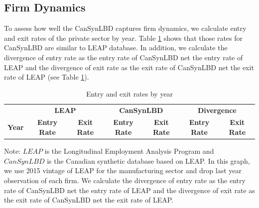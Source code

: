 \documentclass{article}
\begin{document}
\subsection{Firm Dynamics}
To assess how well the CanSynLBD captures firm dynamics, we calculate entry and exit rates of the private sector by year. Table \ref{FirmDynamics} shows that those rates for CanSynLBD are similar to LEAP database. In addition, we calculate the divergence of entry rate as the entry rate of CanSynLBD net the entry rate of LEAP and the divergence of exit rate as the exit rate of CanSynLBD net the exit rate of LEAP (see Table  \ref{FirmDynamics}).

\begin{table}[H]
  \centering
\begin{threeparttable}
 \caption{Entry and exit rates by year} \label{FirmDynamics} \medskip
\renewcommand{\arraystretch}{1}
\begin{tabular}{l|c c| c c| c c}
\toprule
&\multicolumn{2}{c|}{\textbf{LEAP}} &  \multicolumn{2}{c|}{\textbf{CanSynLBD}}&  \multicolumn{2}{c}{\textbf{Divergence}}\\
\textbf{Year}&\textbf{Entry Rate}&\textbf{Exit Rate}&\textbf{Entry Rate}&\textbf{Exit Rate} &\textbf{Entry Rate}&\textbf{Exit Rate}\\
\midrule

   \bottomrule
  \end{tabular} 
\begin{tablenotes}
\small
\item Note: $LEAP$ is the Longitudinal Employment Analysis Program and $CanSynLBD$ is the Canadian synthetic database based on LEAP. In this graph, we use 2015 vintage of LEAP for the manufacturing sector and drop last year observation of each firm. We calculate the divergence of entry rate as the entry rate of CanSynLBD net the entry rate of LEAP and the divergence of exit rate as the exit rate of CanSynLBD net the exit rate of LEAP.
 \end{tablenotes}
 \end{threeparttable}
\end{table}
\end{document}
